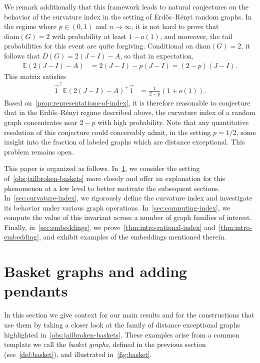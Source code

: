 \documentclass[11pt,a4paper]{article}
\newcommand{\ep}[1]{\mathbb{E}\left({#1}\right)}
\newcommand{\distmatrix}{D}
\newcommand{\one}{\vec{1}}
\begin{document}
    We remark additionally that this framework leads to natural conjectures on the behavior of the curvature index in the setting of Erd\H{o}s--R\'{e}nyi random graphs. In the regime where $p\in(0,1)$ and $n\to\infty$, it is not hard to prove that $\mathrm{diam}(G)=2$ with probability at least $1-o(1)$, and moreover, the tail probabilities for this event are quite forgiving. Conditional on $\mathrm{diam}(G)=2$, it follows that $\distmatrix(G) = 2(J - I) - A$, so that in expectation,
        \begin{align*}
            \ep{2(J - I) - A} &= 2(J - I) - p(J - I) = (2 - p)(J - I).
        \end{align*}
    This matrix satisfies
        \begin{align*}
            \one^\top \ep{2(J - I) - A}^+ \one &= \frac{1}{2-p}(1+o(1)).
        \end{align*}
    Based on~\cref{prop:representations-of-index}, it is therefore reasonable to conjecture that in the Erd\H{o}s--R\'{e}nyi regime described above, the curvature index of a random graph concentrates near $2-p$ with high probability. Note that any quantitative resolution of this conjecture could conceivably admit, in the setting $p=1/2$, some insight into the fraction of labeled graphs which are distance exceptional. This problem remains open.

    This paper is organized as follows. In~\cref{sec:basket-example}, we consider the setting of~\cref{obs:jailbroken-baskets} more closely and offer an explanation for this phenomenon at a low level to better motivate the subsequent sections. In~\cref{sec:curvature-index}, we rigorously define the curvature index and investigate its behavior under various graph operations. In~\cref{sec:computing-index}, we compute the value of this invariant across a number of graph families of interest. Finally, in~\cref{sec:embeddings}, we prove~\cref{thm:intro-rational-index} and~\cref{thm:intro-embedding}, and exhibit examples of the embeddings mentioned therein. 

    \section{Basket graphs and adding pendants}\label{sec:basket-example}

    In this section we give context for our main results and for the constructions that use them by taking a closer look at the family of distance exceptional graphs highlighted in~\cref{obs:jailbroken-baskets}. These examples arise from a common template we call the \emph{basket graphs}, defined in the previous section (see~\cref{def:basket}), and illustrated in~\cref{fig:basket}.
\end{document}
